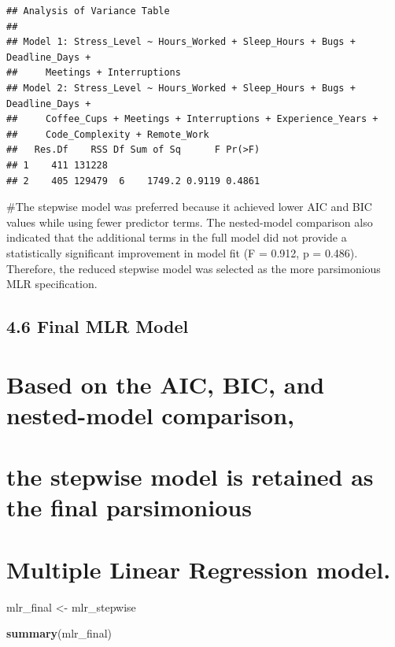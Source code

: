 \documentclass[
]{article}
\newenvironment{Shaded}{\begin{snugshade}}{\end{snugshade}}
\newcommand{\FunctionTok}[1]{\textcolor[rgb]{0.13,0.29,0.53}{\textbf{#1}}}
\newcommand{\NormalTok}[1]{#1}
\newcommand{\OtherTok}[1]{\textcolor[rgb]{0.56,0.35,0.01}{#1}}
\begin{document}
\begin{verbatim}
## Analysis of Variance Table
## 
## Model 1: Stress_Level ~ Hours_Worked + Sleep_Hours + Bugs + Deadline_Days + 
##     Meetings + Interruptions
## Model 2: Stress_Level ~ Hours_Worked + Sleep_Hours + Bugs + Deadline_Days + 
##     Coffee_Cups + Meetings + Interruptions + Experience_Years + 
##     Code_Complexity + Remote_Work
##   Res.Df    RSS Df Sum of Sq      F Pr(>F)
## 1    411 131228                           
## 2    405 129479  6    1749.2 0.9119 0.4861
\end{verbatim}

\#The stepwise model was preferred because it achieved lower AIC and BIC
values while using fewer predictor terms. The nested-model comparison
also indicated that the additional terms in the full model did not
provide a statistically significant improvement in model fit (F = 0.912,
p = 0.486). Therefore, the reduced stepwise model was selected as the
more parsimonious MLR specification.

\subsection{4.6 Final MLR Model}\label{final-mlr-model}

\section{Based on the AIC, BIC, and nested-model
comparison,}\label{based-on-the-aic-bic-and-nested-model-comparison}

\section{the stepwise model is retained as the final
parsimonious}\label{the-stepwise-model-is-retained-as-the-final-parsimonious}

\section{Multiple Linear Regression
model.}\label{multiple-linear-regression-model.}

\begin{Shaded}
\begin{Highlighting}[]
\NormalTok{mlr\_final }\OtherTok{\textless{}{-}}\NormalTok{ mlr\_stepwise}
\end{Highlighting}
\end{Shaded}

\begin{Shaded}
\begin{Highlighting}[]
\FunctionTok{summary}\NormalTok{(mlr\_final)}
\end{Highlighting}
\end{Shaded}
\end{document}
